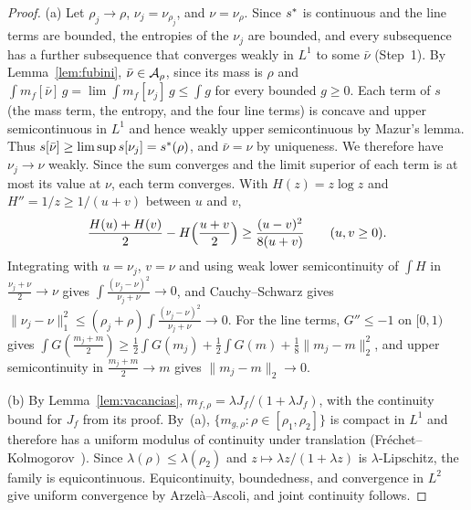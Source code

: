 \begin{proof} (a) Let $\rho_j\to\rho$, $\nu_j=\nu_{\rho_j}$, and $\nu=\nu_\rho$. Since $s^{*}$ is continuous and the line terms are
bounded, the entropies of the $\nu_j$ are bounded, and every subsequence has a further subsequence that converges weakly in $L^1$ to
some $\bar\nu$ (Step~1). By Lemma~\ref{lem:fubini}, $\bar\nu\in{\mathcal{A}}_\rho$, since its mass is $\rho$ and $\int m_f[\bar\nu]\,g=\lim\int
m_f[\nu_j]\,g\le\int g$ for every bounded $g\ge0$. Each term of $s$ (the mass term, the entropy, and the four line terms) is concave
and upper semicontinuous in $L^1$ and hence weakly upper semicontinuous by Mazur's lemma. Thus $s[\bar\nu]\ge\limsup
s[\nu_j]=s^{*}(\rho)$, and $\bar\nu=\nu$ by uniqueness. We therefore have $\nu_j\to\nu$ weakly. Since the sum converges and the limit
superior of each term is at most its value at $\nu$, each term converges. With $H(z)=z\log z$ and $H''=1/z\ge1/(u+v)$ between $u$ and $v$,
\[
 \frac{H(u)+H(v)}2-H\Bigl(\frac{u+v}2\Bigr)\ge\frac{(u-v)^2}{8(u+v)}\qquad(u,v\ge0).
\] Integrating with $u=\nu_j$, $v=\nu$ and using weak lower semicontinuity of $\int H$ in $\frac{\nu_j+\nu}2\to\nu$ gives
$\int\frac{(\nu_j-\nu)^2}{\nu_j+\nu}\to0$, and Cauchy--Schwarz gives
$\|\nu_j-\nu\|_1^2\le(\rho_j+\rho)\int\frac{(\nu_j-\nu)^2}{\nu_j+\nu}\to0$. For the line terms, $G''\le-1$ on $[0,1)$ gives $\int
G(\frac{m_j+m}2)\ge\frac12\int G(m_j)+\frac12\int G(m)+\frac18\|m_j-m\|_2^2$, and upper semicontinuity in $\frac{m_j+m}2\to m$ gives
$\|m_j-m\|_2\to0$.

(b) By Lemma~\ref{lem:vacancias}, $m_{f,\rho}=\lambda J_f/(1+\lambda J_f)$, with the continuity bound for $J_f$ from its proof. By~(a),
$\{m_{g,\rho}:\rho\in[\rho_1,\rho_2]\}$ is compact in $L^1$ and therefore has a uniform modulus of continuity under translation
(Fréchet--Kolmogorov~\cite{Brezis}). Since $\lambda(\rho)\le\lambda(\rho_2)$ and $z\mapsto\lambda z/(1+\lambda z)$ is
$\lambda$-Lipschitz, the family is equicontinuous. Equicontinuity, boundedness, and convergence in $L^2$ give uniform convergence by
Arzelà--Ascoli, and joint continuity follows. \end{proof}
